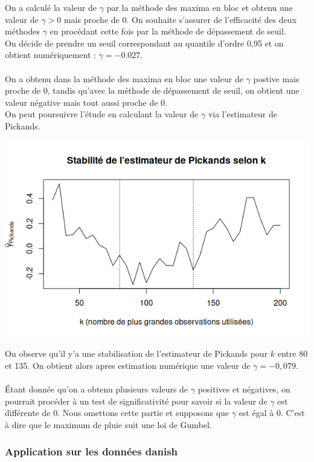 \documentclass{article}
\theoremstyle{plain}
\theoremstyle{definition}
\theoremstyle{plain}
\begin{document}
\noindent On a calculé la valeur de $\gamma$ par la méthode des maxima en bloc et obtenu une valeur de $\gamma > 0 $ mais proche de 0. On souhaite s'assurer de l'efficacité des deux méthodes $\gamma$
en procédant cette fois par la méthode de dépassement de seuil.
\\
On décide de prendre un seuil correspondant au quantile d’ordre 0,95 et on obtient numériquement : $\gamma  = -0.027$.
\\
\\
On a obtenu dans la méthode des maxima en bloc une valeur de $\gamma$ postive mais proche de 0,
tandis qu'avec la méthode de dépassement de seuil, on obtient une valeur négative mais tout aussi proche de 0.
\\
On peut poursuivre l'étude en calculant la valeur de $\gamma$ via l'estimateur de Pickands.

\begin{center}
	\includegraphics[scale=0.57]{./images/pickandsrain.png} 
\end{center}

\noindent On observe qu'il y'a une stabilisation de l'estimateur de Pickands pour $k$ entre 80 et 135. On obtient alors apres estimation numérique une valeur de $\gamma = -0,079$.
\\
\\
Étant donnée qu'on a obtenu plusieurs valeurs de $\gamma$ positives et négatives, on pourrait procéder à un test de significativité pour savoir si la valeur de $\gamma$ est différente de 0. Nous omettons cette partie et supposons que $\gamma$ est égal à 0. C'est à dire que le maximum de pluie suit une loi de Gumbel.
\\
\subsubsection{Application sur les données danish}
\end{document}
